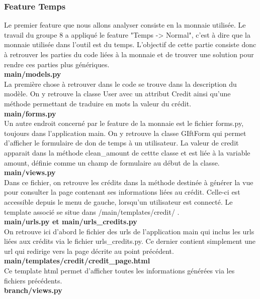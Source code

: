 \subsubsection{Feature Temps}
Le premier feature que nous allons analyser consiste en la monnaie utilisée.  Le travail du groupe 8 a appliqué le feature "Temps -> Normal",  c'est à dire que la monnaie utilisée dans l'outil est du temps.  L'objectif de cette partie consiste donc à retrouver les parties du code liées à la monnaie et de trouver une solution pour rendre ces parties plus génériques.
\\
\textbf{main/models.py}
\\%
La première chose à retrouver dans le code se trouve dans la description du modèle.  On y retrouve la classe User avec un attribut Credit ainsi qu'une méthode permettant de traduire en mots la valeur du crédit.
\\
\textbf{main/forms.py}
\\%
Un autre endroit concerné par le feature de la monnaie est le fichier forms.py,  toujours dans l'application main.  On y retrouve la classe GIftForm qui permet d'afficher le formulaire de don de temps à un utilisateur.  La valeur de credit apparait dans la méthode clean\_amount de cettte classe et est liée à la variable amount,  définie comme un champ de formulaire au début de la classe.
\\
\textbf{main/views.py}
\\%
Dans ce fichier,  on retrouve les crédits dans la méthode destinée à générer la vue pour consulter la page contenant ses informations liées au crédit.  Celle-ci est accessible depuis le menu de gauche,  lorsqu'un utilisateur est connecté.  Le template associé se situe dans /main/templates/credit/ .
\\
\textbf{main/urls.py et main/urls\_credits.py}
\\%
On retrouve ici d'abord le fichier des urls de l'application main qui inclus les urls liées aux crédits via le fichier urls\_credits.py.  Ce dernier contient simplement une url qui redirige vers la page décrite au point précédent.
\\
\textbf{main/templates/credit/credit\_page.html}
\\%
Ce template html permet d'afficher toutes les informations générées via les fichiers précédents.
\\
\textbf{branch/views.py}
\\%
